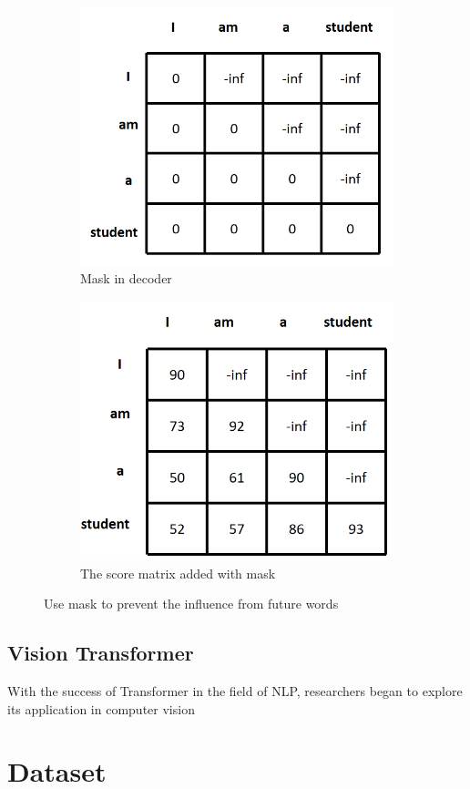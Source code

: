   \begin{figure}[htbp]
		\centering
		\begin{subfigure}[b]{0.5\textwidth}
			\centering
			\includegraphics[width=0.9\linewidth]{example_images/mask}
			\caption{Mask in decoder}
			\label{Mask in decoder}
		\end{subfigure}
		\hfill
		\begin{subfigure}[b]{0.5\textwidth}
			\centering
			\includegraphics[width=0.9\linewidth]{example_images/mask1}
			\caption{The score matrix added with mask}
			\label{The score matrix added with mask}
		\end{subfigure}
		\caption{Use mask to prevent the influence from future words}
		\label{Use mask to prevent the influence from future words}
	\end{figure}
\subsection{Vision Transformer}
  With the success of Transformer in the field of NLP, researchers began to explore its application in computer vision
\section{Dataset}